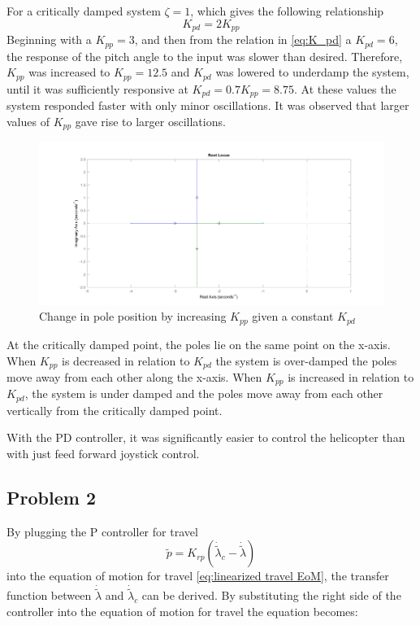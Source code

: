 %
For a critically damped system $\zeta = 1$, which gives the following
relationship
%
\begin{equation}
  \label{eq:K_pd}
  K_{pd} = 2K_{pp}
\end{equation}
%
Beginning with a $K_{pp} = 3$, and then from the relation in
\cref{eq:K_pd} a $K_{pd} = 6$, the response of the pitch angle
to the input was slower than desired. Therefore, $K_{pp}$ was
increased to $K_{pp} = 12.5$ and $K_{pd}$ was lowered to underdamp the
system, until it  was sufficiently responsive at $K_{pd} = 0.7K_{pp} =
8.75$. At these values the system responded faster with only minor
oscillations. It was observed that larger values of $K_{pp}$ gave rise
to larger oscillations.
%
\begin{figure}[H]
  \caption{Change in pole position by increasing $K_{pp}$ given a
    constant $K_{pd}$}
  \label{fig:Root_Locus}
  \includegraphics[width=\textwidth]{images/Root_Locus}
\end{figure}
%
At the critically damped point, the poles lie on the same point on
the x-axis. When $K_{pp}$ is decreased in relation to $K_{pd}$ the
system is over-damped the poles move away from each other along the
x-axis. When $K_{pp}$ is increased in relation to $K_{pd}$, the system
is under damped and the poles move away from each other vertically
from the critically damped point.

With the PD controller, it was significantly easier to control the
helicopter than with just feed forward joystick control.

\subsection{Problem 2}
By plugging the P controller for travel
\begin{equation}
\label{travel P controller}
\tilde{p} = K_{rp}(\dot{\tilde{\lambda}}_c - \dot{\tilde{\lambda}})
\end{equation}
into the equation of motion for travel \cref{eq:linearized travel
  EoM}, the transfer function between $\dot{\tilde{\lambda}}$ and
$\dot{\tilde{\lambda}}_c$  can be derived. By substituting the right
side of the controller into the equation of motion for travel the
equation becomes:


